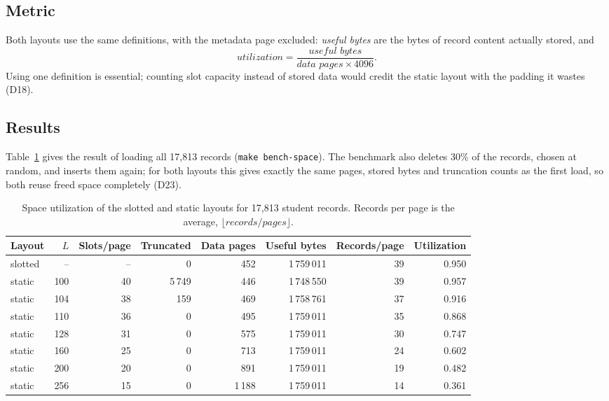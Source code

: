 \documentclass[11pt,a4paper]{article}
\begin{document}
\subsection{Metric}

Both layouts use the same definitions, with the metadata page excluded: \emph{useful bytes} are the bytes of record content actually stored, and
\[
\textit{utilization} = \frac{\textit{useful bytes}}{\textit{data pages} \times 4096}.
\]
Using one definition is essential; counting slot capacity instead of stored data would credit the static layout with the padding it wastes (D18).

\subsection{Results}

Table~\ref{tab:space} gives the result of loading all 17{,}813 records (\texttt{make bench-space}). The benchmark also deletes 30\% of the records, chosen at random, and inserts them again; for both layouts this gives exactly the same pages, stored bytes and truncation counts as the first load, so both reuse freed space completely (D23).

\begin{table}[H]
\centering
\small
\caption{Space utilization of the slotted and static layouts for 17{,}813 student records. Records per page is the average, \(\lfloor \textit{records} / \textit{pages} \rfloor\).}
\label{tab:space}
\begin{tabular}{lrrrrrrr}
\toprule
Layout & \(L\) & Slots/page & Truncated & Data pages & Useful bytes & Records/page & Utilization \\
\midrule
slotted & -- & -- & 0 & 452 & 1\,759\,011 & 39 & 0.950 \\
\midrule
static & 100 & 40 & 5\,749 & 446 & 1\,748\,550 & 39 & 0.957 \\
static & 104 & 38 & 159 & 469 & 1\,758\,761 & 37 & 0.916 \\
static & 110 & 36 & 0 & 495 & 1\,759\,011 & 35 & 0.868 \\
static & 128 & 31 & 0 & 575 & 1\,759\,011 & 30 & 0.747 \\
static & 160 & 25 & 0 & 713 & 1\,759\,011 & 24 & 0.602 \\
static & 200 & 20 & 0 & 891 & 1\,759\,011 & 19 & 0.482 \\
static & 256 & 15 & 0 & 1\,188 & 1\,759\,011 & 14 & 0.361 \\
\bottomrule
\end{tabular}
\end{table}
\end{document}
